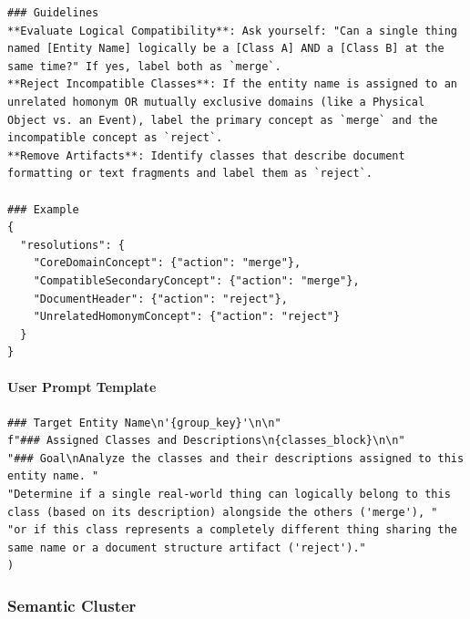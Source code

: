 \begin{verbatim}
### Guidelines
**Evaluate Logical Compatibility**: Ask yourself: "Can a single thing named [Entity Name] logically be a [Class A] AND a [Class B] at the same time?" If yes, label both as `merge`.
**Reject Incompatible Classes**: If the entity name is assigned to an unrelated homonym OR mutually exclusive domains (like a Physical Object vs. an Event), label the primary concept as `merge` and the incompatible concept as `reject`.
**Remove Artifacts**: Identify classes that describe document formatting or text fragments and label them as `reject`.

### Example
{
  "resolutions": {
    "CoreDomainConcept": {"action": "merge"},
    "CompatibleSecondaryConcept": {"action": "merge"},
    "DocumentHeader": {"action": "reject"},
    "UnrelatedHomonymConcept": {"action": "reject"}
  }
}
\end{verbatim}

\paragraph*{User Prompt Template}
\begin{verbatim}
### Target Entity Name\n'{group_key}'\n\n"
f"### Assigned Classes and Descriptions\n{classes_block}\n\n"
"### Goal\nAnalyze the classes and their descriptions assigned to this entity name. "
"Determine if a single real-world thing can logically belong to this class (based on its description) alongside the others ('merge'), "
"or if this class represents a completely different thing sharing the same name or a document structure artifact ('reject')."
)
\end{verbatim}

\vspace{1em}

\subsubsection*{Semantic Cluster}

